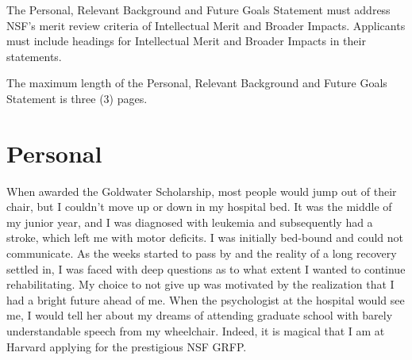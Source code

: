 \documentclass[11pt]{article} %
\begin{document}
The Personal, Relevant Background and Future Goals Statement must address NSF's merit review criteria of Intellectual Merit and Broader Impacts. Applicants must include headings for Intellectual Merit and Broader Impacts in their statements.

The maximum length of the Personal, Relevant Background and Future Goals Statement is three (3) pages.
\section{Personal}
When awarded the Goldwater Scholarship, most people would jump out of their chair, but I couldn't move up or down in my hospital bed. It was the middle of my junior year, and I was diagnosed with leukemia and subsequently had a stroke, which left me with motor deficits. I was initially bed-bound and could not communicate. As the weeks started to pass by and the reality of a long recovery settled in, I was faced with deep questions as to what extent I wanted to continue rehabilitating. My choice to not give up was motivated by the realization that I had a bright future ahead of me. When the psychologist at the hospital would see me, I would tell her about my dreams of attending graduate school with barely understandable speech from my wheelchair. Indeed, it is magical that I am at Harvard applying for the prestigious NSF GRFP.
\end{document}
